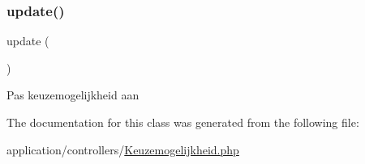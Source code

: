 \subsubsection{\texorpdfstring{update()}{update()}}
{\footnotesize\ttfamily update (\begin{DoxyParamCaption}{ }\end{DoxyParamCaption})}

Pas keuzemogelijkheid aan 

The documentation for this class was generated from the following file\+:\begin{DoxyCompactItemize}
\item 
application/controllers/\mbox{\hyperlink{_keuzemogelijkheid_8php}{Keuzemogelijkheid.\+php}}\end{DoxyCompactItemize}
